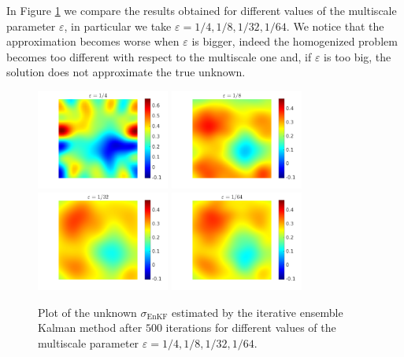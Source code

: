 \documentclass[10pt]{article}
\begin{document}
In Figure \ref{fig:comparison_e} we compare the results obtained for different values of the multiscale parameter $\varepsilon$, in particular we take $\varepsilon = 1/4, 1/8, 1/32, 1/64$. We notice that the approximation becomes worse when $\varepsilon$ is bigger, indeed the homogenized problem becomes too different with respect to the multiscale one and, if $\varepsilon$ is too big, the solution does not approximate the true unknown.

\begin{figure}[t]
\centering
\includegraphics[width = 0.39\textwidth]{figures/ensemble_500_e4}
\includegraphics[width = 0.39\textwidth]{figures/ensemble_500_e8}
\\
\includegraphics[width = 0.39\textwidth]{figures/ensemble_500_e32}
\includegraphics[width = 0.39\textwidth]{figures/ensemble_500_e64}
\caption{Plot of the unknown $\sigma_{\mathrm{EnKF}}$ estimated by the iterative ensemble Kalman method after $500$ iterations for different values of the multiscale parameter $\varepsilon = 1/4, 1/8, 1/32, 1/64$.}
\label{fig:comparison_e}
\end{figure}
\end{document}
